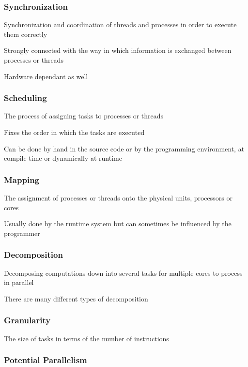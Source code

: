 \documentclass{article}
\begin{document}
\subsubsection{Synchronization}

Synchronization and coordination of threads and processes in order to execute them correctly

Strongly connected with the way in which information is exchanged between processes or threads

Hardware dependant as well

\subsubsection{Scheduling}

The process of assigning tasks to processes or threads

Fixes the order in which the tasks are executed

Can be done by hand in the source code or by the programming environment, at compile time or dynamically at runtime

\subsubsection{Mapping}

The assignment of processes or threads onto the physical units, processors or cores

Usually done by the runtime system but can sometimes be influenced by the programmer

\subsubsection{Decomposition}

Decomposing computations down into several tasks for multiple cores to process in parallel

There are many different types of decomposition

\subsubsection{Granularity}

The size of tasks in terms of the number of instructions

\subsubsection{Potential Parallelism}
\end{document}

